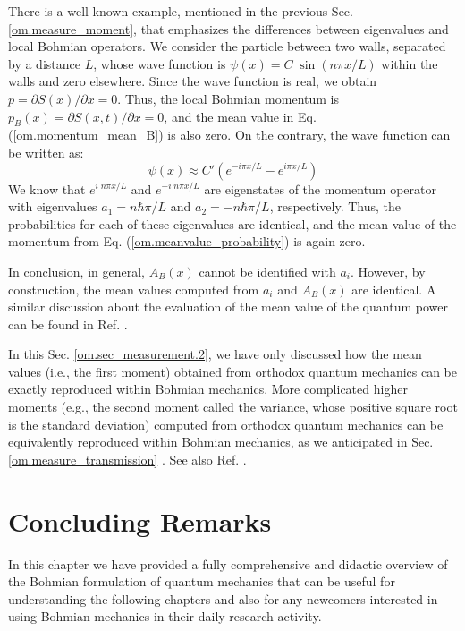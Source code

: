 \documentclass[onecolumn,nofootinbib, secnumarabic, amsmath, nobibnotes,11pt,aps,pra]{revtex4-1}
\newcommand{\sref}[1]{Sec. \ref{#1}}
\newcommand{\eref}[1]{Eq. (\ref{#1})}
\begin{document}
There is a well-known example, mentioned in the previous
\sref{om.measure_moment}, that emphasizes the differences between
eigenvalues and local Bohmian operators. We consider the particle
between two walls, separated by a distance $L$, whose wave function
is $\psi(x) = C \; \sin(n\pi x/L)$ within the walls and zero
elsewhere. Since the wave function is real, we obtain $p = \partial
S(x)/\partial x = 0$. Thus, the local Bohmian momentum is $p_B(x) =
{\partial S(x,t)}/{\partial x} = 0$, and the mean value in
\eref{om.momentum_mean_B} is also zero. On the contrary, the wave
function can be written as:
\begin{equation}
\psi(x) \approx C' \left(e^{-i\pi x/L}-e^{i\pi x/L} \right)
\end{equation}
We know that $e^{i \; n \pi x/L}$ and $e^{-i \; n \pi x/L}$ are
eigenstates of the momentum operator with eigenvalues $a_1 = n \hbar
\pi/L$ and $a_2 = -n \hbar \pi/L$, respectively. Thus, the
probabilities for each of these eigenvalues are identical, and the
mean value of the momentum from \eref{om.meanvalue_probability} is
again zero.

In conclusion, in general, $A_B(x)$ cannot be identified with $a_i$.
However, by construction, the mean values computed from $a_i$ and
$A_B(x)$ are identical. A similar discussion about the evaluation of
the mean value of the  quantum power can be found in Ref.
\cite{om.quantumpower}.

In this \sref{om.sec_measurement.2}, we have only discussed how the
mean values (i.e., the first moment) obtained from orthodox quantum
mechanics can be exactly reproduced within Bohmian mechanics. More
complicated higher moments (e.g., the second moment called the
variance, whose positive square root is the standard deviation)
computed from orthodox quantum mechanics can be equivalently
reproduced within Bohmian mechanics, as we anticipated in
\sref{om.measure_transmission} \cite{om.Durrnaive,om.Durrllibre,
om.goldstein}. See also Ref. \cite{om.Muga}.


\section{Concluding Remarks}

In this chapter we have provided a fully comprehensive and didactic overview of the Bohmian formulation of quantum mechanics that can be useful for understanding the following chapters and also for any newcomers interested in using Bohmian mechanics in their daily research activity.
\end{document}
